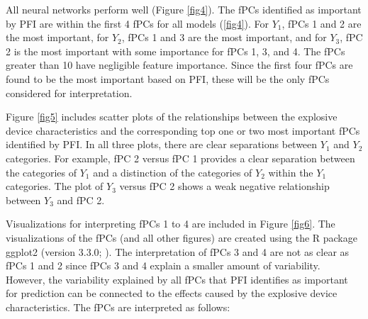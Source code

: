 \documentclass[letterpaper]{article}
\begin{document}
All neural networks perform well (Figure \ref{fig4}). The fPCs identified as important by PFI are within the first 4 fPCs for all models (\ref{fig4}). For \(Y_1\), fPCs 1 and 2 are the most important, for \(Y_2\), fPCs 1 and 3 are the most important, and for \(Y_3\), fPC 2 is the most important with some importance for fPCs 1, 3, and 4. The fPCs greater than 10 have negligible feature importance. Since the first four fPCs are found to be the most important based on PFI, these will be the only fPCs considered for interpretation.

Figure \ref{fig5} includes scatter plots of the relationships between the explosive device characteristics and the corresponding top one or two most important fPCs identified by PFI. In all three plots, there are clear separations between \(Y_1\) and \(Y_2\) categories. For example, fPC 2 versus fPC 1 provides a clear separation between the categories of \(Y_1\) and a distinction of the categories of \(Y_2\) within the \(Y_1\) categories. The plot of \(Y_3\) versus fPC 2 shows a weak negative relationship between \(Y_3\) and fPC 2.

Visualizations for interpreting fPCs 1 to 4 are included in Figure \ref{fig6}. The visualizations of the fPCs (and all other figures) are created using the R package ggplot2 (version 3.3.0; \citeauthor{wickham:2016} \citeyear{wickham:2016}). The interpretation of fPCs 3 and 4 are not as clear as fPCs 1 and 2 since fPCs 3 and 4 explain a smaller amount of variability. However, the variability explained by all fPCs that PFI identifies as important for prediction can be connected to the effects caused by the explosive device characteristics. The fPCs are interpreted as follows:
\end{document}
